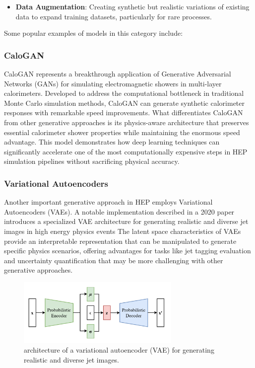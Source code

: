 \documentclass[letterpaper,12pt]{article}
\begin{document}
\begin{spacing}{1.125}
\begin{itemize}
    \item \textbf{Data Augmentation}: Creating synthetic but realistic variations of existing data to expand training datasets, particularly for rare processes.
\end{itemize}

Some popular examples of models in this category include:
    \subsubsection{CaloGAN\cite{calogan}}  
    CaloGAN represents a breakthrough application of Generative Adversarial Networks (GANs) for simulating electromagnetic showers in multi-layer calorimeters. Developed to address the computational bottleneck in traditional Monte Carlo simulation methods, CaloGAN can generate synthetic calorimeter responses with remarkable speed improvements.
    What differentiates CaloGAN from other generative approaches is its physics-aware architecture that preserves essential calorimeter shower properties while maintaining the enormous speed advantage. This model demonstrates how deep learning techniques can significantly accelerate one of the most computationally expensive steps in HEP simulation pipelines without sacrificing physical accuracy.

    \subsubsection{Variational Autoencoders} 
    Another important generative approach in HEP employs Variational Autoencoders (VAEs). A notable implementation described in a 2020 paper introduces a specialized VAE architecture for generating realistic and diverse jet images in high energy physics events
    The latent space characteristics of VAEs provide an interpretable representation that can be manipulated to generate specific physics scenarios, offering advantages for tasks like jet tagging evaluation and uncertainty quantification that may be more challenging with other generative approaches.

    \begin{figure}[H]
\centering
\includegraphics[width=0.7\textwidth]{variaitonal-autoencoders.png}
\caption{architecture of a variational autoencoder (VAE) for generating realistic and diverse jet images.}
    \end{figure}


\end{spacing}
\end{document}
